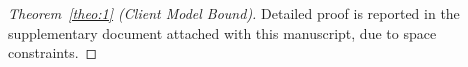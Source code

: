 \documentclass[lettersize,journal]{IEEEtran}
\newtheorem{proof}{Proof}
\begin{document}
\begin{proof}[Theorem~\ref{theo:1} (Client Model Bound)]
Detailed proof is reported in the supplementary document attached with this manuscript, due to space constraints.








\end{proof}
\end{document}
